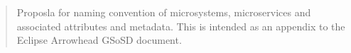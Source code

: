\documentclass[a4paper]{arrowhead}
\begin{document}
\ArrowheadType{}
\ArrowheadDate{\today}
\ArrowheadSetup

\begin{center}
  \vspace*{1cm}
  \huge{\arrowtitle}

  \vspace*{0.2cm}
  \LARGE{\arrowtype}
  \vspace*{1cm}

  \vspace*{\fill}


  \vspace*{1cm}
  \vspace*{\fill}

  \begin{abstract}
    Proposla for naming convention of microsystems, microservices and
    associated attributes and metadata. This is intended as an
    appendix to the Eclipse Arrowhead GSoSD document.  
  \end{abstract}

  \vspace*{1cm}

 \end{center}

\newpage
\end{document}
